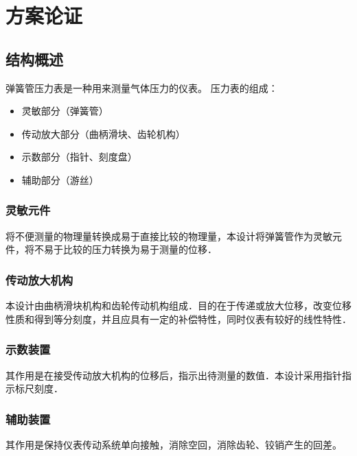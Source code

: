 \section{方案论证}
\subsection{结构概述}
弹簧管压力表是一种用来测量气体压力的仪表。
\newline
压力表的组成：
\begin{itemize}
    \item 灵敏部分（弹簧管）
    \item 传动放大部分（曲柄滑块、齿轮机构）
    \item 示数部分（指针、刻度盘）
    \item 辅助部分（游丝）
\end{itemize}
\subsubsection{灵敏元件}
将不便测量的物理量转换成易于直接比较的物理量，本设计将弹簧管作为灵敏元件，将不易于比较的压力转换为易于测量的位移．
\subsubsection{传动放大机构}
本设计由曲柄滑块机构和齿轮传动机构组成．目的在于传递或放大位移，改变位移性质和得到等分刻度，并且应具有一定的补偿特性，同时仪表有较好的线性特性．
\subsubsection{示数装置}
其作用是在接受传动放大机构的位移后，指示出待测量的数值．本设计采用指针指示标尺刻度．
\subsubsection{辅助装置}
其作用是保持仪表传动系统单向接触，消除空回，消除齿轮、铰销产生的回差。
